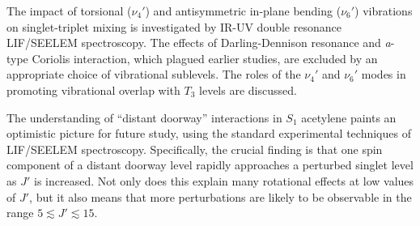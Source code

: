 

The impact of torsional ($\nu_4'$) and antisymmetric in-plane bending
($\nu_6'$) vibrations on singlet-triplet mixing is investigated by
IR-UV double resonance LIF/SEELEM spectroscopy.  The effects of
Darling-Dennison resonance and \emph{a}-type Coriolis interaction,
which plagued earlier studies, are excluded by an appropriate choice
of vibrational sublevels.  The roles of the $\nu_4'$ and $\nu_6'$ modes in
promoting vibrational overlap with $T_3$ levels are discussed.

The understanding of ``distant doorway'' interactions in $S_1$
acetylene paints an optimistic picture for future study, using the
standard experimental techniques of LIF/SEELEM spectroscopy.
Specifically, the crucial finding is that one spin component of a
distant doorway level rapidly approaches a perturbed singlet level as
$J'$ is increased.  Not only does this explain many rotational effects
at low values of $J'$, but it also means that more perturbations are
likely to be observable in the range $5 \lesssim J' \lesssim 15$.

